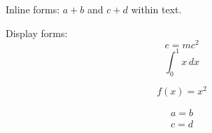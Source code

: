 Inline forms: $a + b$ and \(c + d\) within text.

Display forms:
$$ e = mc^2 $$
\[ \int_0^1 x \, dx \]

\begin{equation}
  f(x) = x^2 \tag{$\star$}
\end{equation}

\begin{gather}
  a = b \\
  c = d
\end{gather}
